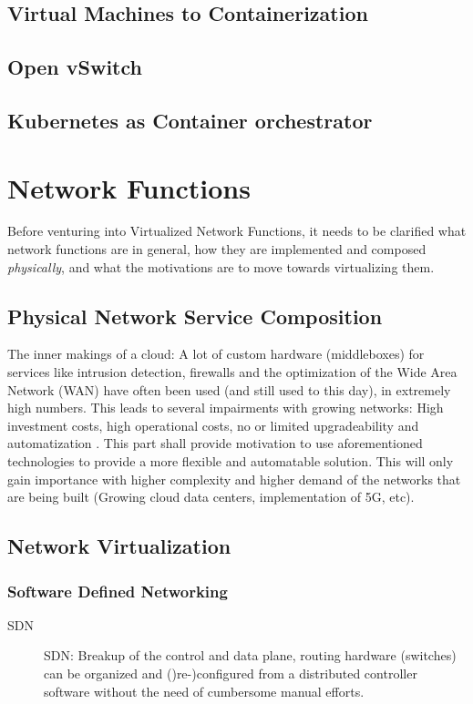 \subsection{Virtual Machines to Containerization}
\subsection{Open vSwitch}
\subsection{Kubernetes as Container orchestrator}

\quad

\section{Network Functions}
Before venturing into Virtualized Network Functions, it needs to be clarified what network functions are in general, how they are implemented and composed \textit{physically}, and what the motivations are to move towards virtualizing them. 
\subsection{Physical Network Service Composition}
The inner makings of a cloud: A lot of custom hardware (middleboxes) for services like intrusion detection, firewalls and the optimization of the Wide Area Network (WAN) have often been used (and still used to this day), in extremely high numbers. This leads to several impairments with growing networks: High investment costs, high operational costs, no or limited upgradeability and automatization   \cite{sherry2016middleboxes}. This part shall provide motivation to use aforementioned technologies to provide a more flexible and automatable solution. This will only gain importance with higher complexity and higher demand of the networks that are being built (Growing cloud data centers, implementation of 5G, etc). 

\subsection{Network Virtualization}
\subsubsection{Software Defined Networking}
\begin{description}
	\item [SDN] SDN: Breakup of the control and data plane, routing hardware (switches) can be organized and ()re-)configured from a distributed controller software without the need of cumbersome manual efforts.
\end{description}

